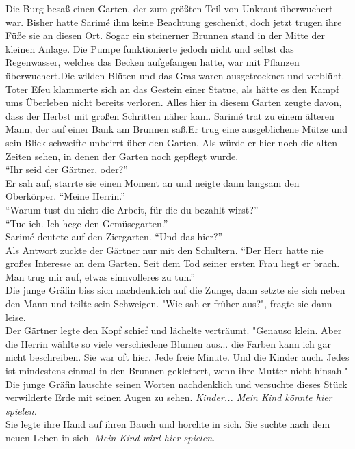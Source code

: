 Die Burg besaß einen Garten, der zum größten Teil von Unkraut überwuchert war. Bisher hatte Sarimé 
ihm keine Beachtung geschenkt, doch jetzt trugen ihre Füße sie an diesen Ort. Sogar ein steinerner 
Brunnen stand in der Mitte der kleinen Anlage. Die Pumpe funktionierte jedoch nicht und selbst das 
Regenwasser, welches das Becken aufgefangen hatte, war mit Pflanzen überwuchert.Die wilden Blüten 
und das Gras waren ausgetrocknet und verblüht. Toter Efeu klammerte sich an das Gestein einer 
Statue, als hätte es den Kampf ums Überleben nicht bereits verloren. Alles hier in diesem Garten 
zeugte davon, dass der Herbst mit großen Schritten näher kam. Sarimé trat zu einem älteren Mann, 
der auf einer Bank am Brunnen saß.Er trug eine ausgeblichene Mütze und sein Blick schweifte 
unbeirrt über den Garten. Als würde er hier noch die alten Zeiten sehen, in denen der Garten noch 
gepflegt wurde.\\
``Ihr seid der Gärtner, oder?''\\
Er sah auf, starrte sie einen Moment an und neigte dann langsam den Oberkörper. ``Meine Herrin.''\\
``Warum tust du nicht die Arbeit, für die du bezahlt wirst?''\\
``Tue ich. Ich hege den Gemüsegarten.''\\
Sarimé deutete auf den Ziergarten. ``Und das hier?''\\
Als Antwort zuckte der Gärtner nur mit den Schultern. ``Der Herr hatte nie großes Interesse an dem 
Garten. Seit dem Tod seiner ersten Frau liegt er brach. Man trug mir auf, etwas sinnvolleres zu 
tun.''\\
Die junge Gräfin biss sich nachdenklich auf die Zunge, dann setzte sie sich neben den Mann und 
teilte sein Schweigen. "Wie sah er früher aus?", fragte sie dann leise.\\
Der Gärtner legte den Kopf schief und lächelte verträumt. "Genauso klein. Aber die Herrin wählte so 
viele verschiedene Blumen aus... die Farben kann ich gar nicht beschreiben. Sie war oft hier. Jede 
freie Minute. Und die Kinder auch. Jedes ist mindestens einmal in den Brunnen geklettert, wenn ihre 
Mutter nicht hinsah."\\
Die junge Gräfin lauschte seinen Worten nachdenklich und versuchte dieses Stück verwilderte Erde 
mit 
seinen Augen zu sehen. \textit{Kinder... Mein Kind könnte hier spielen.}\\
Sie legte ihre Hand auf ihren Bauch und horchte in sich. Sie suchte nach dem neuen Leben in 
sich. \textit{Mein Kind wird hier spielen.}\\
